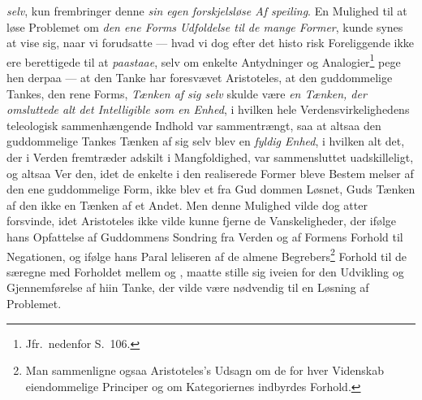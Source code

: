 \emph{selv}, kun frembringer denne \emph{sin egen forskjelsløse Af\-%
\setcounter{footnote}{0}%
speiling}. En Mulighed til at løse Problemet om \emph{den ene
Forms Udfoldelse til de mange Former}, kunde synes
at vise sig, naar vi forudsatte --- hvad vi dog efter det histo\-%
risk Foreliggende ikke ere berettigede til at \emph{paastaae}, selv
om enkelte Antydninger og Analogier\footnote{Jfr.\ nedenfor S.\ 106.} pege hen derpaa ---
at den Tanke har foresvævet Aristoteles, at den guddommelige
Tankes, den rene Forms, \emph{Tænken af sig selv} skulde være
\emph{en Tænken, der omsluttede alt det Intelligible som
en Enhed}, i hvilken hele Verdensvirkelighedens teleologisk
sammenhængende Indhold var sammentrængt, saa at altsaa
den guddommelige Tankes Tænken af sig selv blev en \emph{fyldig
Enhed}, i hvilken alt det, der i Verden fremtræder adskilt i
Mangfoldighed, var sammensluttet uadskilleligt, og altsaa Ver\-%
den, idet de enkelte i den realiserede Former bleve Bestem\-%
melser af den ene guddommelige Form, ikke blev et fra Gud\-%
dommen Løsnet, Guds Tænken af den ikke en Tænken af et
Andet. Men denne Mulighed vilde dog atter forsvinde, idet
Aristoteles ikke vilde kunne fjerne de Vanskeligheder, der
ifølge hans Opfattelse af Guddommens Sondring fra Verden
og af Formens Forhold til Negationen, og ifølge hans Paral\-%
leliseren af de almene Begrebers\footnote{Man sammenligne ogsaa
  Aristoteles's Udsagn om de for hver Videnskab eiendommelige
  Principer og om Kategoriernes indbyrdes Forhold.} Forhold til de særegne med
Forholdet mellem  og , maatte stille sig
iveien for den Udvikling og Gjennemførelse af hiin Tanke,
der vilde være nødvendig til en Løsning af Problemet.

